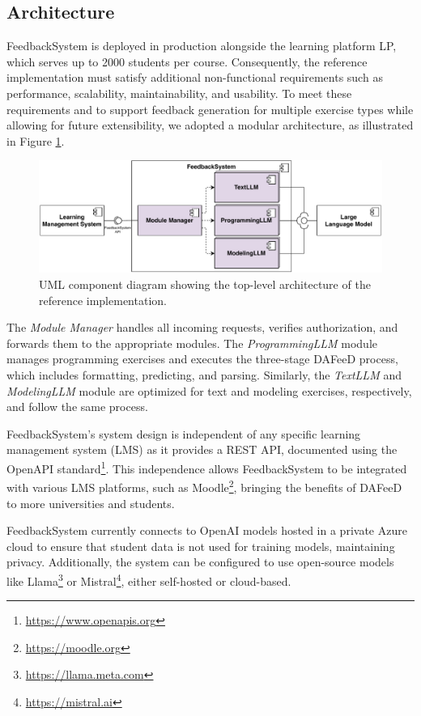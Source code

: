 \documentclass[sigconf,screen,review,anonymous]{acmart}
\begin{document}
\subsection{Architecture}

FeedbackSystem is deployed in production alongside the learning platform LP, which serves up to 2000 students per course.
Consequently, the reference implementation must satisfy additional non-functional requirements such as performance, scalability, maintainability, and usability.
To meet these requirements and to support feedback generation for multiple exercise types while allowing for future extensibility, we adopted a modular architecture, as illustrated in Figure \ref{fig:Athena-architecture}.

\begin{figure}[htbp]
  \centering
  \includegraphics[width=\linewidth]{figures/Athena-Architecture.pdf}
  \caption{UML component diagram showing the top-level architecture of the reference implementation.}
  \label{fig:Athena-architecture}
\end{figure}

The \textit{Module Manager} handles all incoming requests, verifies authorization, and forwards them to the appropriate modules.
The \textit{ProgrammingLLM} module manages programming exercises and executes the three-stage DAFeeD process, which includes formatting, predicting, and parsing. 
Similarly, the \textit{TextLLM} and \textit{ModelingLLM} module are optimized for text and modeling exercises, respectively, and follow the same process.

FeedbackSystem's system design is independent of any specific learning management system (LMS) as it provides a REST API, documented using the OpenAPI standard\footnote{\url{https://www.openapis.org}}.
This independence allows FeedbackSystem to be integrated with various LMS platforms, such as Moodle\footnote{\url{https://moodle.org}}, bringing the benefits of DAFeeD to more universities and students.

FeedbackSystem currently connects to OpenAI models hosted in a private Azure cloud to ensure that student data is not used for training models, maintaining privacy.
Additionally, the system can be configured to use open-source models like Llama\footnote{\url{https://llama.meta.com}} or Mistral\footnote{\url{https://mistral.ai}}, either self-hosted or cloud-based.
\end{document}
